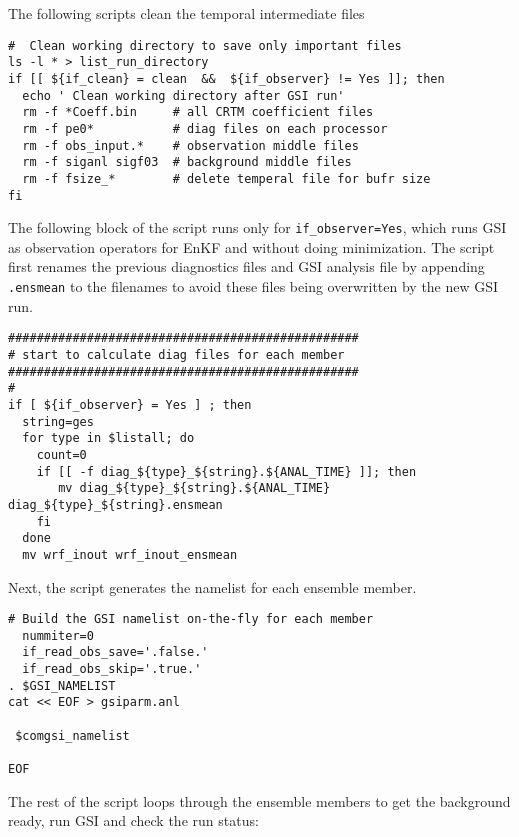 The following scripts clean the temporal intermediate files

\begin{footnotesize}
\begin{verbatim}
#  Clean working directory to save only important files
ls -l * > list_run_directory
if [[ ${if_clean} = clean  &&  ${if_observer} != Yes ]]; then
  echo ' Clean working directory after GSI run'
  rm -f *Coeff.bin     # all CRTM coefficient files
  rm -f pe0*           # diag files on each processor
  rm -f obs_input.*    # observation middle files
  rm -f siganl sigf03  # background middle files
  rm -f fsize_*        # delete temperal file for bufr size
fi
\end{verbatim}
\end{footnotesize}

The following block of the script runs only for \verb|if_observer=Yes|, which runs GSI as observation operators for EnKF and without doing minimization. The script first renames the previous diagnostics files and GSI analysis file by appending \verb| .ensmean| to the filenames to avoid these files being overwritten by the new GSI run.

\begin{footnotesize}
\begin{verbatim}
#################################################
# start to calculate diag files for each member
#################################################
#
if [ ${if_observer} = Yes ] ; then
  string=ges
  for type in $listall; do
    count=0
    if [[ -f diag_${type}_${string}.${ANAL_TIME} ]]; then
       mv diag_${type}_${string}.${ANAL_TIME} diag_${type}_${string}.ensmean
    fi
  done
  mv wrf_inout wrf_inout_ensmean
\end{verbatim}
\end{footnotesize}

Next, the script generates the namelist for each ensemble member.

\begin{footnotesize}
\begin{verbatim}
# Build the GSI namelist on-the-fly for each member
  nummiter=0
  if_read_obs_save='.false.'
  if_read_obs_skip='.true.'
. $GSI_NAMELIST
cat << EOF > gsiparm.anl

 $comgsi_namelist

EOF
\end{verbatim}
\end{footnotesize}

The rest of the script loops through the ensemble members to get the background ready, run GSI and check the run status: 


